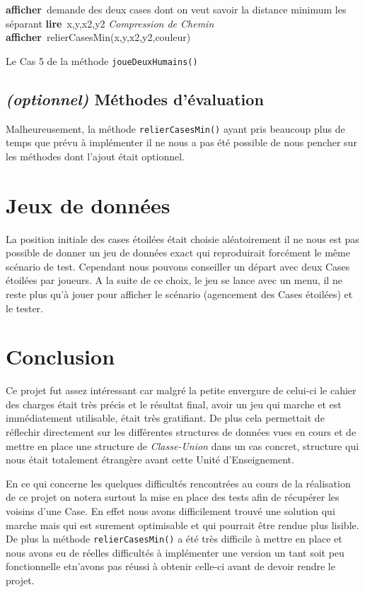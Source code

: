 \documentclass{article}
\newcommand{\info}{\texttt}
\newcommand{\Affiche}{\textbf{afficher}}
\newcommand{\Lit}{\textbf{lire}}
\begin{document}
                \begin{algorithm}[ht]
                \Affiche\ demande des deux cases dont on veut savoir la distance minimum les séparant\;
                \Lit\ x,y,x2,y2\;
                \emph{Compression de Chemin}
                \Affiche\ relierCasesMin(x,y,x2,y2,couleur)\;
                \caption{Le Cas 5 de la méthode \info{joueDeuxHumains()}}
                \end{algorithm}
                

    \subsection{\emph{(optionnel)} Méthodes d'évaluation}

        Malheureusement, la méthode \info{relierCasesMin()} ayant pris beaucoup plus de temps que prévu à implémenter il ne nous a pas été possible de nous pencher sur les méthodes dont l'ajout était optionnel.

\section{Jeux de données}

    La position initiale des cases étoilées était choisie aléatoirement il ne nous est pas possible de donner un jeu de données exact qui reproduirait forcément le même scénario de test. Cependant nous pouvons conseiller un départ avec deux Cases étoilées par joueurs. A la suite de ce choix, le jeu se lance avec un menu, il ne reste plus qu'à jouer pour afficher le scénario (agencement des Cases étoilées) et le tester.

\section{Conclusion}

    Ce projet fut assez intéressant car malgré la petite envergure de celui-ci le cahier des charges était très précis et le résultat final, avoir un jeu qui marche et est immédiatement utilisable, était très gratifiant. De plus cela permettait de réflechir directement sur les différentes structures de données vues en cours et de mettre en place une structure de \emph{Classe-Union} dans un cas concret, structure qui nous était totalement étrangère avant cette Unité d'Enseignement.
    
    En ce qui concerne les quelques difficultés rencontrées au cours de la réalisation de ce projet on notera surtout la mise en place des tests afin de récupérer les voisins d'une Case. En effet nous avons difficilement trouvé une solution qui marche mais qui est surement optimisable et qui pourrait être rendue plus lisible. De plus la méthode \info{relierCasesMin()} a été très difficile à mettre en place et nous avons eu de réelles difficultés à implémenter une version un tant soit peu fonctionnelle etn'avons pas réussi à obtenir celle-ci avant de devoir rendre le projet.
\end{document}
